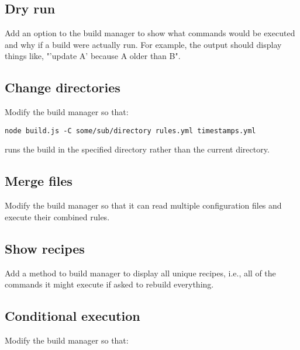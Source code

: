 \documentclass[krantzl]{krantz}
\begin{document}
\subsection*{Dry run}


Add an option to the build manager to show what commands would be executed and why
if a build were actually run.
For example,
the output should display things like, "'update A' because A older than B".

\subsection*{Change directories}


Modify the build manager so that:

\begin{lstlisting}[frame=single,frameround=tttt]
node build.js -C some/sub/directory rules.yml timestamps.yml
\end{lstlisting}


\noindent runs the build in the specified directory rather than the current directory.

\subsection*{Merge files}


Modify the build manager so that it can read multiple configuration files
and execute their combined rules.

\subsection*{Show recipes}


Add a method to build manager to display all unique recipes,
i.e.,
all of the commands it might execute if asked to rebuild everything.

\subsection*{Conditional execution}


Modify the build manager so that:
\end{document}
